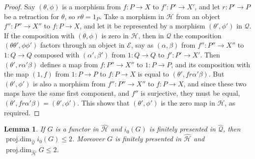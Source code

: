 \documentclass[11pt,a4paper]{amsart}
\theoremstyle{plain}
\newtheorem{lem}[thm]{Lemma}
\theoremstyle{definition}
\begin{document}
\begin{proof}
Say $(\theta,\phi)$ is a morphism from $f\colon P\to X$ to $f'\colon P'\to X'$, 
and let $r\colon P'\to P$ be a retraction for $\theta$, so $r \theta = 1_P$.
Take a morphism in ${\mathcal{H}}$ from an object $f''\colon P''\to X''$ to $f\colon P\to X$, and let it be represented by
a morphism $(\theta',\phi')$ in ${\mathcal{Q}}$. If the composition with $(\theta,\phi)$ is zero in ${\mathcal{H}}$,
then in ${\mathcal{Q}}$ the composition $(\theta \theta',\phi \phi')$ factors through an object in ${\mathcal{E}}$,
say as $(\alpha,\beta)$ from $f''\colon P''\to X''$ to $1\colon Q\to Q$ composed with $(\alpha',\beta')$ from $1\colon Q\to Q$
to $f'\colon P'\to X'$. 
Then $(\theta',r \alpha' \beta)$ defines a map from $f\colon P''\to X''$ to $1\colon P\to P$, and its
composition with the map $(1,f)$ from $1\colon P\to P$ to $f\colon P\to X$ is equal to $(\theta',f r \alpha' \beta)$.
But $(\theta',\phi')$ is also a morphism from $f''\colon P''\to X''$ to $f\colon P\to X$, and since these two maps have
the same first component, and $f''$ is surjective, they must be equal, $(\theta',f r \alpha' \beta) = (\theta',\phi')$.
This shows that $(\theta',\phi')$ is the zero map in ${\mathcal{H}}$, as required.
\end{proof}

\begin{lem}
\label{l:pdlemma}
If $G$ is a functor in ${\widehat{\mathcal{H}}  }$ and $i_0(G)$ is finitely presented in ${ \widehat{\mathcal{Q}}}$, 
then $\operatorname{proj.dim}_{ \widehat{\mathcal{Q}}} i_0(G) \le 2$.
Moreover $G$ is finitely presented in ${\widehat{\mathcal{H}}  }$ and $\operatorname{proj.dim}_{\widehat{\mathcal{H}}  } G \le 2$. 
\end{lem}
\end{document}
